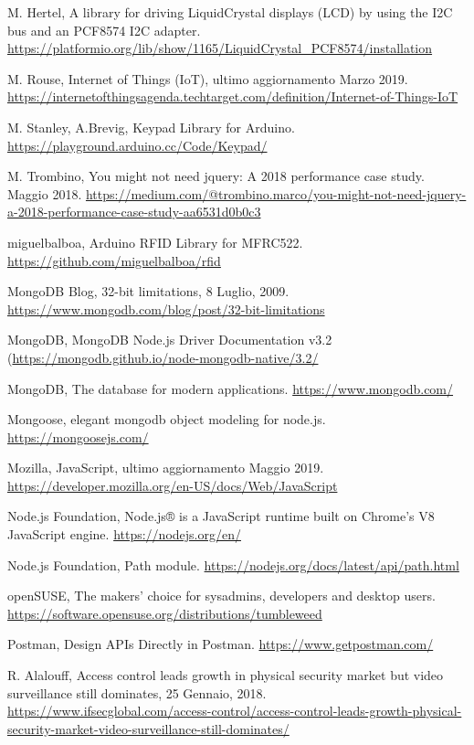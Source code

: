 \documentclass[12pt]{report}
\begin{document}
\begin{thebibliography}{00}
%
M. Hertel, A library for driving LiquidCrystal displays (LCD) by using the I2C bus and an PCF8574 I2C adapter.
\url{https://platformio.org/lib/show/1165/LiquidCrystal_PCF8574/installation}
%

%
M. Rouse, Internet of Things (IoT), ultimo aggiornamento Marzo 2019.
\url{https://internetofthingsagenda.techtarget.com/definition/Internet-of-Things-IoT}
% 

%
M. Stanley, A.Brevig, Keypad Library for Arduino.
\url{https://playground.arduino.cc/Code/Keypad/}
%

%
M. Trombino, You might not need jquery: A 2018 performance
case study. Maggio 2018. 
\url{https://medium.com/@trombino.marco/you-might-not-need-jquery-a-2018-performance-case-study-aa6531d0b0c3}
%

%
miguelbalboa, Arduino RFID Library for MFRC522.
\url{https://github.com/miguelbalboa/rfid}
%

%
MongoDB Blog, 32-bit limitations, 8 Luglio, 2009.
\url{https://www.mongodb.com/blog/post/32-bit-limitations}
%

%
MongoDB, MongoDB Node.js Driver Documentation v3.2
(\url{https://mongodb.github.io/node-mongodb-native/3.2/}
%

%
MongoDB, The database for modern applications.
\url{https://www.mongodb.com/}
%

%
Mongoose, elegant mongodb object modeling for node.js.
\url{https://mongoosejs.com/}
%

%
Mozilla, JavaScript, ultimo aggiornamento Maggio 2019.
\url{https://developer.mozilla.org/en-US/docs/Web/JavaScript}
%

%
Node.js Foundation, Node.js® is a JavaScript runtime built on Chrome's V8 JavaScript engine. \url{https://nodejs.org/en/}
%

%
Node.js Foundation, Path module.
\url{https://nodejs.org/docs/latest/api/path.html}
%

%
openSUSE, The makers' choice for sysadmins, developers and desktop users.
\url{https://software.opensuse.org/distributions/tumbleweed}
%

%
Postman, Design APIs Directly in Postman.
\url{https://www.getpostman.com/}
%

%
R. Alalouff, Access control leads growth in physical security market but video surveillance still dominates, 25 Gennaio, 2018.
\url{https://www.ifsecglobal.com/access-control/access-control-leads-growth-physical-security-market-video-surveillance-still-dominates/}
%


\end{thebibliography}
\end{document}
